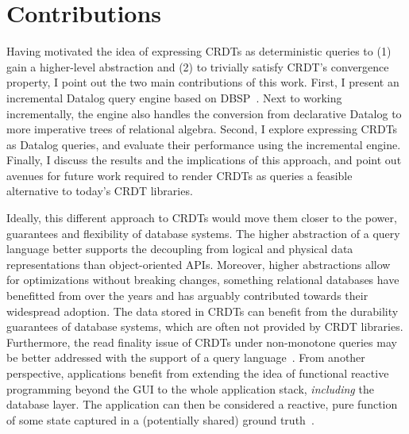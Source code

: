 \section{Contributions}


Having motivated the idea of expressing \acp{CRDT} as deterministic queries to
(1) gain a higher-level abstraction and (2) to trivially satisfy \ac{CRDT}'s
convergence property,
I point out the two main contributions of this work.
First, I present an incremental Datalog query engine based on DBSP~\cite{budiu2022dbsp}.
Next to working incrementally, the engine also handles the conversion from
declarative Datalog to more imperative trees of relational algebra.
Second, I explore expressing \acp{CRDT} as Datalog queries, and evaluate
their performance using the incremental engine.
Finally, I discuss the results and the implications of this approach,
and point out avenues for future work required to render \acp{CRDT} as queries
a feasible alternative to today's \ac{CRDT} libraries.

Ideally, this different approach to \acp{CRDT} would move them closer to the power,
guarantees and flexibility of database systems.
The higher abstraction of a query language better supports the decoupling from
logical and physical data representations than object-oriented APIs.
Moreover, higher abstractions allow for optimizations without breaking changes,
something relational databases have benefitted from over the years and has
arguably contributed towards their widespread adoption.
The data stored in \acp{CRDT} can benefit from the durability guarantees of
database systems, which are often not provided by \ac{CRDT} libraries.
Furthermore, the read finality issue of \acp{CRDT} under non-monotone queries
may be better addressed with the support of a query language~\cite{laddad2022keep}.
From another perspective, applications benefit from extending the idea of functional
reactive programming beyond the \ac{GUI} to the whole application stack,
\emph{including} the database layer.
The application can then be considered a reactive, pure function
of some state captured in a (potentially shared) ground truth~\cite{litt2023riffle}.

